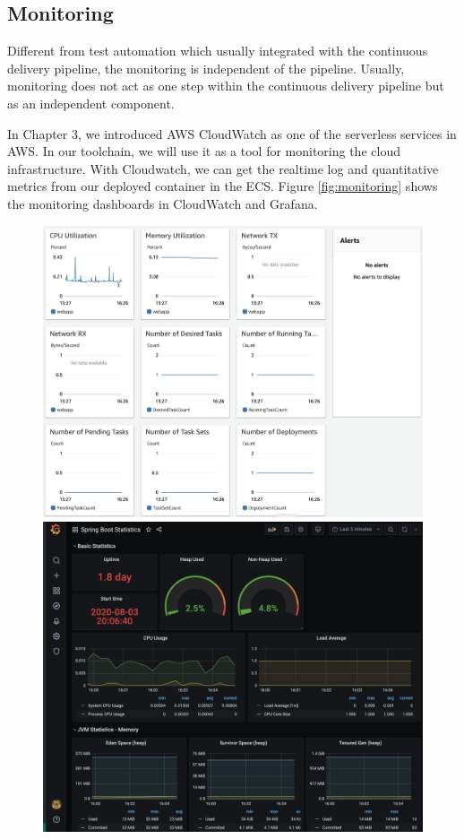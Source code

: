 \subsection{Monitoring}
Different from test automation which usually integrated with the continuous delivery pipeline, the monitoring is independent of the pipeline. Usually, monitoring does not act as one step within the continuous delivery pipeline but as an independent component.
\par
In Chapter 3, we introduced AWS CloudWatch as one of the serverless services in AWS. In our toolchain, we will use it as a tool for monitoring the cloud infrastructure. With Cloudwatch, we can get the realtime log and quantitative metrics from our deployed container in the ECS. Figure \ref{fig:monitoring} shows the monitoring dashboards in CloudWatch and Grafana.
\begin{figure}[!tbp]
     \centering
     \begin{minipage}[b]{0.47\textwidth}
       \includegraphics[width=\textwidth]{pics/monitoring.png}
     \end{minipage}
     \hfill
     \begin{minipage}[b]{0.50\textwidth}
       \includegraphics[width=\textwidth]{pics/grafana.png}

\end{minipage}
\end{figure}
